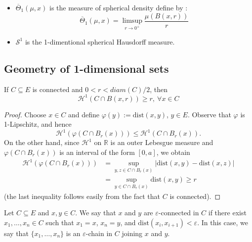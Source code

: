 \documentclass[12pt]{article}
\begin{document}
{\begin{remark}
    \begin{itemize}
        \item [(i)] $\overline{\Theta}_1(\mu, x)$ is the measure of spherical density define by : \[ \overline{\Theta}_1(\mu, x) = \limsup_{r \to 0^+} \frac{\mu(B(x,r))}{r} \]
        \item[(ii)] $\mathcal{S}^1$ is the 1-dimentional spherical Hausdorff measure.
    \end{itemize}
\end{remark}



\subsection{Geometry of 1-dimensional sets}

\begin{lemma}
    If $C \subseteq E$ is connected and $0<r<diam(C)/2$, then $$\mathcal{H}^1(C \cap B(x,r)) \geq r, \ \forall x \in C$$
\end{lemma}

\begin{proof}
    Choose $x \in C$ and define $\varphi(y) := \mathrm{dist}(x, y)$, $y \in E$. Observe 
    that $\varphi$ is 1-Lipschitz, and hence
    \[
        \mathcal{H}^1\!\left(\varphi(C \cap B_r(x))\right) \leqslant \mathcal{H}^1\!\left(C \cap B_r(x)\right).
    \]
    On the other hand, since $\mathcal{H}^1$ on $\mathbb{R}$ is an outer Lebesgue measure and 
    $\varphi(C \cap B_r(x))$ is an interval of the form $[0, a]$, we obtain
    \begin{align*}
        \mathcal{H}^1\!\left(\varphi(C \cap B_r(x))\right) 
            &= \sup_{y,z \in C \cap B_r(x)} |\mathrm{dist}(x,y) - \mathrm{dist}(x,z)| \\
            &= \sup_{y \in C \cap B_r(x)} \mathrm{dist}(x, y) \geqslant r
    \end{align*}
    (the last inequality follows easily from the fact that $C$ is connected).
\end{proof}

\begin{definition}
    Let $C \subseteq E$ and $x, y \in C$. We say that $x$ and $y$ are 
    $\varepsilon$-connected in $C$ if there exist $x_1, \ldots, x_n \in C$ such 
    that $x_1 = x$, $x_n = y$, and $\mathrm{dist}(x_i, x_{i+1}) < \varepsilon$. 
    In this case, we say that $\{x_1, \ldots, x_n\}$ is an $\varepsilon$-chain 
    in $C$ joining $x$ and $y$.
\end{definition}

}
\end{document}

